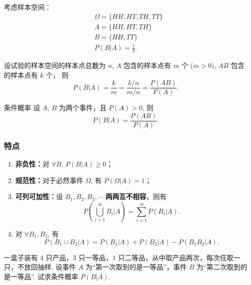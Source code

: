 \documentclass[12pt, a4paper, oneside, UTF8]{ctexbook}
\begin{document}
\begin{solution}
    考虑样本空间：
    \begin{align*}
            & \Omega = \{HH , HT , TH , TT\} \\
            & A = \{HH , HT , TH\} \\
            & B = \{HH , TT\} \\
            & P\left(B | A\right) = \frac{1}{3}.
    \end{align*}
\end{solution}

\begin{corollary}
    设试验的样本空间的样本点总数为 \(n\), \(A\) 包含的样本点有 \(m\) 个 (\(m > 0\)), \(AB\) 包含的样本点有 \(k\) 个， 则
    \[P\left(B|A\right) = \frac{k}{m} = \frac{k/n}{m/n} = \frac{P\left(AB\right)}{P\left(A\right)}.\]
\end{corollary}

\begin{defn}{条件概率}
    设 \(A\), \(B\) 为两个事件，且 \(P\left(A\right) > 0\), 则
    \[P\left(B|A\right) = \frac{P\left(AB\right)}{P\left(A\right)}.\]
\end{defn}

\subsubsection{特点}
\begin{enumerate}
    \item \textbf{非负性：}对 \(\forall B\), \(P\left(B | A\right) \geqslant 0\)；
    \item \textbf{规范性：}对于必然事件 \(\Omega\), 有 \(P\left(\Omega | A\right) = 1\)；
    \item \textbf{可列可加性：}设 \(B_1 , B_2 , B_3 , \cdots\) \textbf{两两互不相容}，则有\[P\left(\bigcup_{i = 1}^\infty B_i | A\right) = \sum_{i = 1}^{\infty} P\left(B_i | A\right).\]
    \item 对 \(\forall B_1 , B_2\), 有 \[P\left(B_1 \cup B_2 | A\right) = P\left(B_1 | A\right) + P\left(B_2 | A\right) - P\left(B_1 B_2 | A\right).\]
\end{enumerate}

\begin{example}
    一盒子装有 \(4\) 只产品，\(3\) 只一等品，\(1\) 只二等品，从中取产品两次，每次任取一只，不放回抽样. 设事件 \(A\) 为“第一次取到的是一等品”，事件 \(B\) 为“第二次取到的是一等品”. 试求条件概率 \(P\left(B | A\right)\).
\end{example}
\end{document}
